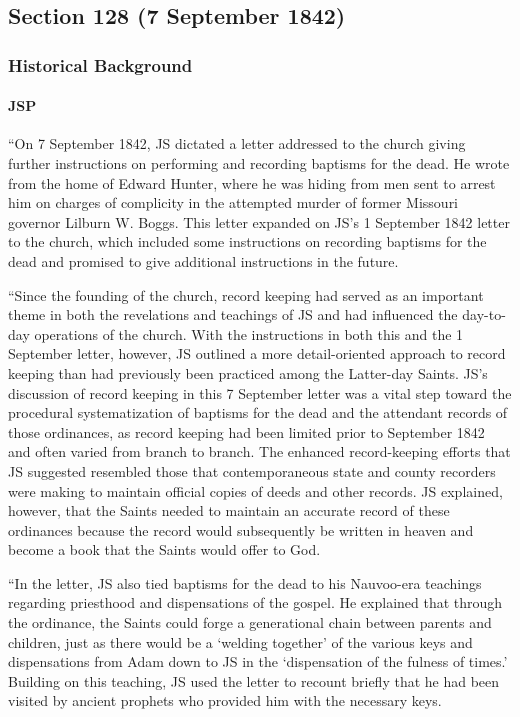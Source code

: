 \subsection{Section 128 (7 September 1842)}
	\label{DC128}
	
	\subsubsection{Historical Background}
		\label{DC128-HB}
		
		\paragraph{JSP}
		
			``On 7 September 1842, JS dictated a letter addressed to the church giving further instructions on performing and recording baptisms for the dead. He wrote from the home of Edward Hunter, where he was hiding from men sent to arrest him on charges of complicity in the attempted murder of former Missouri governor Lilburn W. Boggs. This letter expanded on JS's 1 September 1842 letter to the church, which included some instructions on recording baptisms for the dead and promised to give additional instructions in the future. 

			``Since the founding of the church, record keeping had served as an important theme in both the revelations and teachings of JS and had influenced the day-to-day operations of the church. With the instructions in both this and the 1 September letter, however, JS outlined a more detail-oriented approach to record keeping than had previously been practiced among the Latter-day Saints. JS's discussion of record keeping in this 7 September letter was a vital step toward the procedural systematization of baptisms for the dead and the attendant records of those ordinances, as record keeping had been limited prior to September 1842 and often varied from branch to branch. The enhanced record-keeping efforts that JS suggested resembled those that contemporaneous state and county recorders were making to maintain official copies of deeds and other records. JS explained, however, that the Saints needed to maintain an accurate record of these ordinances because the record would subsequently be written in heaven and become a book that the Saints would offer to God. 

			``In the letter, JS also tied baptisms for the dead to his Nauvoo-era teachings regarding priesthood and dispensations of the gospel. He explained that through the ordinance, the Saints could forge a generational chain between parents and children, just as there would be a `welding together' of the various keys and dispensations from Adam down to JS in the `dispensation of the fulness of times.' Building on this teaching, JS used the letter to recount briefly that he had been visited by ancient prophets who provided him with the necessary keys. 

